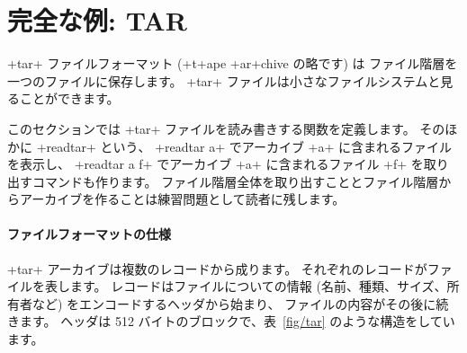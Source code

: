 \section{完全な例: TAR}

\ml+tar+ ファイルフォーマット (\ml+t+ape \ml+ar+chive の略です) は
ファイル階層を一つのファイルに保存します。
\ml+tar+ ファイルは小さなファイルシステムと見ることができます。

このセクションでは \ml+tar+ ファイルを読み書きする関数を定義します。
そのほかに \ml+readtar+ という、 \ml+readtar a+ でアーカイブ \ml+a+ に含まれるファイルを表示し、
\ml+readtar a f+ でアーカイブ \ml+a+ に含まれるファイル \ml+f+ を取り出すコマンドも作ります。
ファイル階層全体を取り出すこととファイル階層からアーカイブを作ることは練習問題として読者に残します。

\paragraph{ファイルフォーマットの仕様}

\ml+tar+ アーカイブは複数のレコードから成ります。
それぞれのレコードがファイルを表します。
レコードはファイルについての情報 (名前、種類、サイズ、所有者など) をエンコードするヘッダから始まり、
ファイルの内容がその後に続きます。
ヘッダは 512 バイトのブロックで、表~\ref{fig/tar} のような構造をしています。


